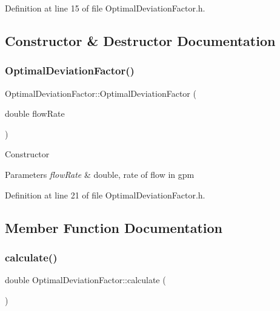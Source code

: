 Definition at line 15 of file Optimal\+Deviation\+Factor.\+h.



\subsection{Constructor \& Destructor Documentation}
\mbox{\label{class_optimal_deviation_factor_a61e6acfd31d44bc1f2f622407ba1e857}} 
\subsubsection{\texorpdfstring{Optimal\+Deviation\+Factor()}{OptimalDeviationFactor()}}
{\footnotesize\ttfamily Optimal\+Deviation\+Factor\+::\+Optimal\+Deviation\+Factor (\begin{DoxyParamCaption}\item[{double}]{flow\+Rate }\end{DoxyParamCaption})\hspace{0.3cm}{\ttfamily [inline]}}

Constructor 
\begin{DoxyParams}{Parameters}
{\em flow\+Rate} & double, rate of flow in gpm \\
\hline
\end{DoxyParams}


Definition at line 21 of file Optimal\+Deviation\+Factor.\+h.



\subsection{Member Function Documentation}
\mbox{\label{class_optimal_deviation_factor_aaa6687bb46d275c4cbcfe44caf895a37}} 
\subsubsection{\texorpdfstring{calculate()}{calculate()}}
{\footnotesize\ttfamily double Optimal\+Deviation\+Factor\+::calculate (\begin{DoxyParamCaption}{ }\end{DoxyParamCaption})}



